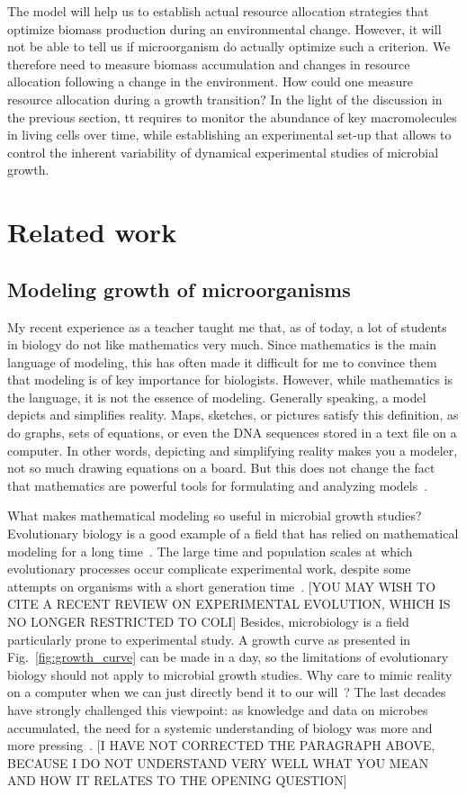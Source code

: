 The model will help us to establish actual resource allocation strategies that optimize biomass production during an environmental change.
However, it will not be able to tell us if microorganism do actually optimize such a criterion.
We therefore need to measure biomass accumulation and changes in resource allocation following a change in the environment.
How could one measure resource allocation during a growth transition?
In the light of the discussion in the previous section, tt requires to monitor the abundance of key macromolecules in living cells over time, while establishing an experimental set-up that allows to control the inherent variability of dynamical experimental studies of microbial growth.

\section{Related work}

\subsection{Modeling growth of microorganisms}

My recent experience as a teacher taught me that, as of today, a lot of students in biology do not like mathematics very much.
Since mathematics is the main language of modeling, this has often made it difficult for me to convince them that modeling is of key importance for biologists.
However, while mathematics is the language, it is not the essence of modeling.
Generally speaking, a model depicts and simplifies reality.
Maps, sketches, or pictures satisfy this definition, as do graphs, sets of equations, or even the DNA sequences stored in a text file on a computer.
In other words, depicting and simplifying reality makes you a modeler, not so much drawing equations on a board.
But this does not change the fact that mathematics are powerful tools for formulating and analyzing models~\cite{servedio_not_2014,mcgill_calm_2013}.

What makes mathematical modeling so useful in microbial growth studies?
Evolutionary biology is a good example of a field that has relied on mathematical modeling for a long time~\cite{servedio_not_2014}.
The large time and population scales at which evolutionary processes occur complicate experimental work, despite some attempts on organisms with a short generation time~\cite{elena_evolution_2003}. [YOU MAY WISH TO CITE A RECENT REVIEW ON EXPERIMENTAL EVOLUTION, WHICH IS NO LONGER RESTRICTED TO COLI]
Besides, microbiology is a field particularly prone to experimental study.
A growth curve as presented in Fig.~\ref{fig:growth_curve} can be made in a day, so the limitations of evolutionary biology should not apply to microbial growth studies.
Why care to mimic reality on a computer when we can just directly bend it to our will~\cite{hillis_why_1993}?
The last decades have strongly challenged this viewpoint: as knowledge and data on microbes accumulated, the need for a systemic understanding of biology was more and more pressing~\cite{alon_introduction_2006,kremling_systems_2013}.
[I HAVE NOT CORRECTED THE PARAGRAPH ABOVE, BECAUSE I DO NOT UNDERSTAND VERY WELL WHAT YOU MEAN AND HOW IT RELATES TO THE OPENING QUESTION]

